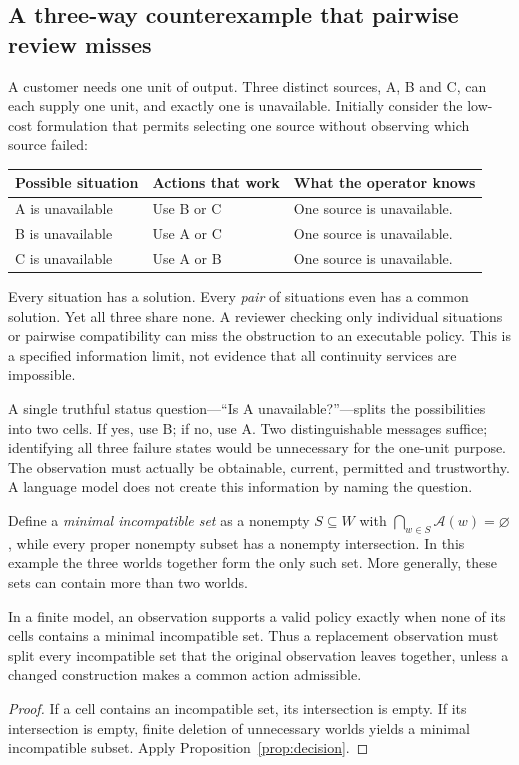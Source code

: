 \subsection{A three-way counterexample that pairwise review misses}
A customer needs one unit of output. Three distinct sources, A, B and C, can each supply one unit, and exactly one is unavailable. Initially consider the low-cost formulation that permits selecting one source without observing which source failed:
\begin{center}
\begin{tabular}{lll}
\toprule
\textbf{Possible situation} & \textbf{Actions that work} & \textbf{What the operator knows}\\
\midrule
A is unavailable & Use B or C & One source is unavailable.\\
B is unavailable & Use A or C & One source is unavailable.\\
C is unavailable & Use A or B & One source is unavailable.\\
\bottomrule
\end{tabular}
\end{center}
Every situation has a solution. Every \emph{pair} of situations even has a common solution. Yet all three share none. A reviewer checking only individual situations or pairwise compatibility can miss the obstruction to an executable policy. This is a specified information limit, not evidence that all continuity services are impossible.

A single truthful status question---``Is A unavailable?''---splits the possibilities into two cells. If yes, use B; if no, use A. Two distinguishable messages suffice; identifying all three failure states would be unnecessary for the one-unit purpose. The observation must actually be obtainable, current, permitted and trustworthy. A language model does not create this information by naming the question.

Define a \emph{minimal incompatible set} as a nonempty $S\subseteq W$ with $\bigcap_{w\in S}\mathcal A(w)=\varnothing$, while every proper nonempty subset has a nonempty intersection. In this example the three worlds together form the only such set. More generally, these sets can contain more than two worlds.

\begin{corollary}
\label{cor:obstruction}
In a finite model, an observation supports a valid policy exactly when none of its cells contains a minimal incompatible set. Thus a replacement observation must split every incompatible set that the original observation leaves together, unless a changed construction makes a common action admissible.
\end{corollary}
\begin{proof}
If a cell contains an incompatible set, its intersection is empty. If its intersection is empty, finite deletion of unnecessary worlds yields a minimal incompatible subset. Apply Proposition~\ref{prop:decision}.
\end{proof}

